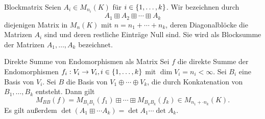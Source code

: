 \documentclass[main.tex]{subfiles}
\begin{document}
\begin{karte}{Blockmatrix}
    Seien \( A_i \in M_{n_i}(K) \) für \( i\in \{1,\ldots,k\} \). 
    Wir bezeichnen durch 
    \[ A_1 \boxplus A_2 \boxplus \cdots \boxplus A_k \] 
    diejenigen Matrix in \( M_n(K) \) mit \( n=n_1 + \cdots + n_k \), 
    deren Diagonalblöcke die Matrizen \( A_i \) sind und deren restliche 
    Einträge Null sind. Sie wird als Blocksumme der Matrizen 
    \( A_1, \ldots, A_k \) bezeichnet.
\end{karte}

\begin{karte}{Direkte Summe von Endomorphismen als Matrix}
    Sei \( f \) die direkte Summe der Endomorphismen 
    \( f_i : V_i \rightarrow V_i, i\in \{1,\ldots, k\} \) 
    mit \( \dim V_i = n_i < \infty \). Sei \( B_i \) 
    eine Basis von \( V_i \). Sei \(B\) die Basis von 
    \( V_1 \oplus \cdots \oplus V_k \), die durch 
    Konkatenation von \( B_1, \ldots, B_k \) entsteht. 
    Dann gilt 
    \[ M_{BB}(f) = M_{B_1B_1}(f_1) \boxplus \cdots \boxplus M_{B_k B_k}(f_k)
    \in M_{ n_1 + \cdot n_k }(K). \]
    Es gilt außerdem \( \det (A_1 \boxplus \cdots A_k) = \det A_1 \cdots \det A_k \).
\end{karte}
\end{document}
